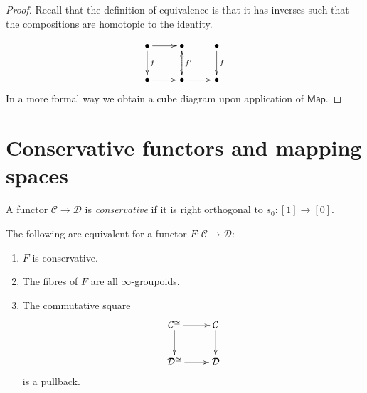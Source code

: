 \begin{proof}
Recall that the definition of
equivalence is that it has inverses such
that the compositions are homotopic to the identity.

$$
\xymatrix{
\bullet\ar[r]\ar[d]^f&\bullet\ar[d]^{f'}&\bullet\ar[d]^{f}\\
\bullet\ar[r]&\bullet\ar@{.>}[u]\ar[r]&\bullet
}
$$
In a more formal way we obtain a cube diagram
upon application of $\mathsf{Map}$.
\end{proof}


\section{Conservative functors and mapping spaces}
\label{section-conservative-functors-and-mapping-spaces}

\begin{definition}
\label{definition-conservative-functor}
A functor $\mathcal{C} \to \mathcal{D}$ is {\it conservative} 
if it is right orthogonal to $s_0:[1]\to [0]$.
\end{definition}

\begin{exercise}
\label{exercise-equivalences-for-conservative-functor}
The following are equivalent for a functor $F:\mathcal{C} \to \mathcal{D}$:
\begin{enumerate}
\item $F$ is conservative.
\label{item-conservative1}

\item The fibres of $F$ are all $\infty$-groupoids.
\label{item-conservative2}

\item The commutative square
\label{item-conservative3}
$$
\xymatrix{
\mathcal{C}^{\simeq}\ar[r]\ar[d]&\mathcal{C}\ar[d]\\
\mathcal{D}^{\simeq}\ar[r]&\mathcal{D}
}
$$
is a pullback.
\end{enumerate}
\end{exercise}


